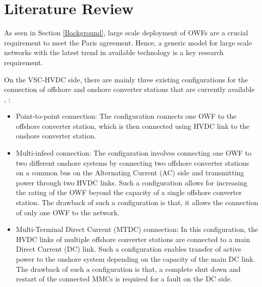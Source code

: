 \section{Literature Review}

As seen in Section \ref{Background}, large scale deployment of \gls{OWF}s are a crucial requirement to meet the Paris agreement. Hence, a generic model for large scale networks with the latest trend in available technology is a key research requirement. 


On the \gls{VSC}-\gls{HVDC} side, there are mainly three existing configurations for the connection of offshore and onshore converter stations that are currently available \cite{cigre_B455}, \cite{sharifabadi2016design}: 
\begin{itemize}
    \item Point-to-point connection: The configuration connects one \gls{OWF} to the offshore converter station, which is then connected using \gls{HVDC} link to the onshore converter station.
    \item Multi-infeed connection: The configuration involves connecting one \gls{OWF} to two different onshore systems by connecting two offshore converter stations on a common bus on the Alternating Current (\gls{AC}) side and transmitting power through two \gls{HVDC} links. Such a configuration allows for increasing the rating of the \gls{OWF} beyond the capacity of a single offshore converter station. The drawback of such a configuration is that, it allows the connection of only one \gls{OWF} to the network.
    \item Multi-Terminal Direct
    Current (MTDC) connection: In this configuration, the \gls{HVDC} links of multiple offshore converter stations are connected to a main Direct Current (\gls{DC}) link. Such a configuration enables transfer of active power to the onshore system depending on the capacity of the main \gls{DC} link. The drawback of such a configuration is that, a complete shut down and restart of the connected \gls{MMC}s is required for a fault on the \gls{DC} side.
\end{itemize}

